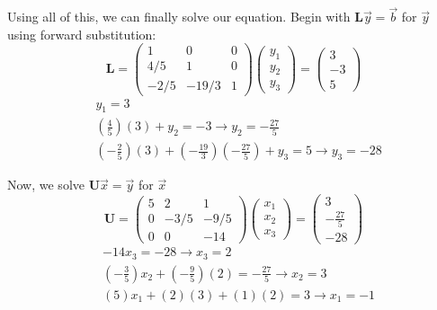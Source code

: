 \documentclass[12pt]{article}
\newcommand{\ve}[1]{\ensuremath{\mathbf{#1}}}
\begin{document}
Using all of this, we can finally solve our equation. Begin with $\ve{L}\vec{y} = \vec{b}$ for $\vec{y}$ using forward substitution:
%
\begin{equation}
\ve{L} = \begin{pmatrix}
  1    & 0     & 0 \\
  4/5  & 1     & 0 \\
  -2/5 & -19/3 & 1
\end{pmatrix}
\begin{pmatrix}
y_1 \\ y_2 \\ y_3
\end{pmatrix}
= \begin{pmatrix}
3 \\ -3 \\ 5
\end{pmatrix} \nonumber
\end{equation}
%
\begin{align}
&\boxed{y_1 = 3} \nonumber \\
&(\frac{4}{5})(3) + y_2 = -3 \rightarrow \boxed{y_2 = -\frac{27}{5}} \nonumber \\
&(-\frac{2}{5})(3) + (-\frac{19}{3})(-\frac{27}{5}) + y_3 = 5
\rightarrow \boxed{y_3 = -28} \nonumber
\end{align}

Now, we solve $\ve{U}\vec{x} = \vec{y}$ for $\vec{x}$
%
\begin{equation}
\ve{U} = \begin{pmatrix}
  5 & 2    & 1 \\
  0 & -3/5 & -9/5 \\
  0 & 0    & -14
\end{pmatrix} 
\begin{pmatrix}
x_1 \\ x_2 \\ x_3
\end{pmatrix}
= \begin{pmatrix}
3 \\ -\frac{27}{5} \\ -28
\end{pmatrix}\nonumber
\end{equation}
%
\begin{align}
&-14 x_3 = -28 \rightarrow \boxed{x_3 = 2} \nonumber \\
&(-\frac{3}{5})x_2 + (-\frac{9}{5})(2) = -\frac{27}{5} \rightarrow \boxed{x_2 = 3} \nonumber \\
&(5)x_1 + (2)(3) + (1)(2) = 3
\rightarrow \boxed{x_1 = -1} \nonumber
\end{align}
\end{document}
